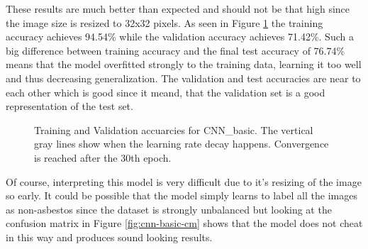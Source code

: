 \quad


These results are much better than expected and should not be that high since the image size is resized to 32x32 pixels. As seen in Figure \ref{fig:cnn-basic} the training accuracy achieves 94.54\% while the validation accuracy achieves 71.42\%. Such a big difference between training accuracy and the final test accuracy of 76.74\% means that the model overfitted strongly to the training data, learning it too well and thus decreasing generalization. The validation and test accuracies are near to each other which is good since it meand, that the validation set is a good representation of the test set.

\begin{figure}[h]
\centering
{}
\caption{Training and Validation accuarcies for CNN\_basic. The vertical gray lines show when the learning rate decay happens. Convergence is reached after the 30th epoch.}
\label{fig:cnn-basic}
\end{figure}


Of course, interpreting this model is very difficult due to it's resizing of the image so early. It could be possible that the model simply learns to label all the images as non-asbestos since the dataset is strongly unbalanced but looking at the confusion matrix in Figure \ref{fig:cnn-basic-cm} shows that the model does not cheat in this way and produces sound looking results.


